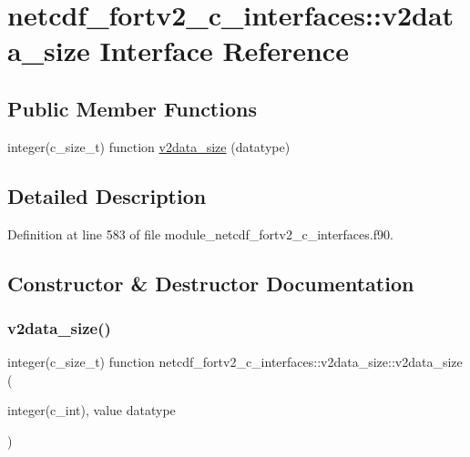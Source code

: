 \hypertarget{interfacenetcdf__fortv2__c__interfaces_1_1v2data__size}{}\section{netcdf\+\_\+fortv2\+\_\+c\+\_\+interfaces\+:\+:v2data\+\_\+size Interface Reference}
\label{interfacenetcdf__fortv2__c__interfaces_1_1v2data__size}
\subsection*{Public Member Functions}
\begin{DoxyCompactItemize}
\item 
integer(c\+\_\+size\+\_\+t) function \hyperlink{interfacenetcdf__fortv2__c__interfaces_1_1v2data__size_abeee5f32a641408e285a9bf82b20f100}{v2data\+\_\+size} (datatype)
\end{DoxyCompactItemize}


\subsection{Detailed Description}


Definition at line 583 of file module\+\_\+netcdf\+\_\+fortv2\+\_\+c\+\_\+interfaces.\+f90.



\subsection{Constructor \& Destructor Documentation}
\mbox{\label{interfacenetcdf__fortv2__c__interfaces_1_1v2data__size_abeee5f32a641408e285a9bf82b20f100}} 
\subsubsection{\texorpdfstring{v2data\+\_\+size()}{v2data\_size()}}
{\footnotesize\ttfamily integer(c\+\_\+size\+\_\+t) function netcdf\+\_\+fortv2\+\_\+c\+\_\+interfaces\+::v2data\+\_\+size\+::v2data\+\_\+size (\begin{DoxyParamCaption}\item[{integer(c\+\_\+int), value}]{datatype }\end{DoxyParamCaption})}



